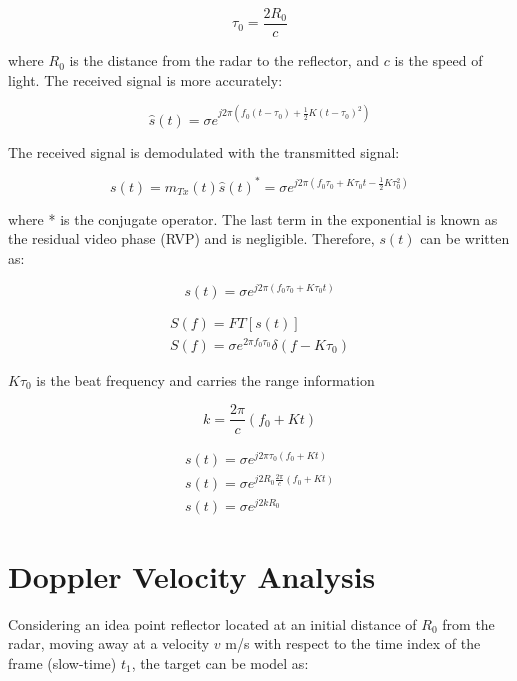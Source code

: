 \documentclass{IEEEtran}
\begin{document}
\begin{equation}
    \tau_0 = \frac{2R_0}{c}
\end{equation}

where $R_0$ is the distance from the radar to the reflector, and $c$ is the speed of light. The received signal is more accurately:

\begin{equation}
    \hat{s}(t) = \sigma e^{j2\pi( f_0 (t-\tau_0) + \frac{1}{2}K(t-\tau_0)^2)}
\end{equation}

The received signal is demodulated with the transmitted signal:

\begin{equation}
    s(t) = m_{Tx}(t)\hat{s}(t)^* = \sigma e^{j2\pi (f_0 \tau_0 + K \tau_0 t - \frac{1}{2}K\tau_0^2)}
\end{equation}

where * is the conjugate operator. The last term in the exponential is known as the residual video phase (RVP) and is negligible. Therefore, $s(t)$ can be written as:

\begin{equation}
    s(t) = \sigma e^{j2\pi(f_0 \tau_0 + K\tau_0 t )}
\end{equation}

\begin{align}
    S(f) = FT[s(t)] \\
    S(f) = \sigma e^{2\pi f_0 \tau_0} \delta (f - K \tau_0)
\end{align}

$K\tau_0$ is the beat frequency and carries the range information

\begin{equation}
    k = \frac{2\pi}{c}(f_0 + Kt)
\end{equation}


\begin{align}
    s(t) = \sigma e^{j2\pi \tau_0 (f_0 + Kt)} \\
    s(t) = \sigma e^{j2R_0 \frac{2\pi}{c}(f_0 + Kt)} \\
    s(t) = \sigma e^{j2k R_0}
\end{align}

\section{Doppler Velocity Analysis}
Considering an idea point reflector located at an initial distance of $R_0$ from the radar, moving away at a velocity $v$ m/s with respect to the time index of the frame (slow-time) $t_1$, the target can be model as:
\end{document}
